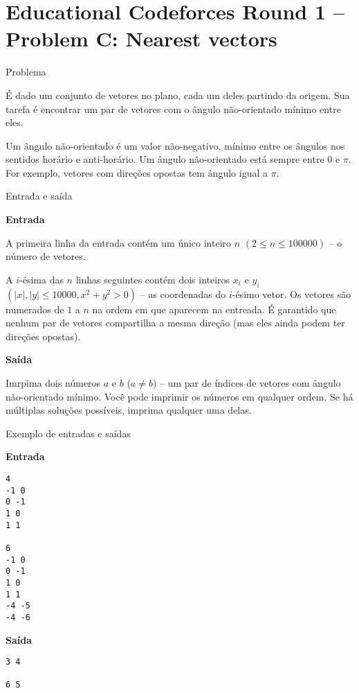 \section{Educational Codeforces Round 1 -- Problem C: Nearest vectors}

\begin{frame}[fragile]{Problema}

É dado um conjunto de vetores no plano, cada um deles partindo da origem. Sua tarefa é encontrar um
par de vetores com o ângulo não-orientado mínimo entre eles.

Um ângulo não-orientado é um valor não-negativo, mínimo entre os ângulos nos sentidos horário e
anti-horário. Um ângulo não-orientado está sempre entre $0$ e $\pi$. For exemplo, vetores com
direções opostas tem ângulo igual a $\pi$.

\end{frame}

\begin{frame}[fragile]{Entrada e saída}

\textbf{Entrada}

A primeira linha da entrada contém um único inteiro $n$ $(2 \leq n \leq 100 000)$ -- o número de
vetores.

A $i$-ésima das $n$ linhas seguintes contém dois inteiros $x_i$ e $y_i$ $(|x|, |y| \leq 10 000, 
x^2 + y^2 > 0)$ -- as coordenadas do $i$-ésimo vetor. Os vetores são numerados de $1$ a $n$ na 
ordem em que aparecem na entreada. É garantido que nenhum par de vetores compartilha a mesma 
direção (mas eles ainda podem ter direções opostas).

\vspace{0.1in}

\textbf{Saída}

Imrpima dois números $a$ e $b$ ($a\neq b$) -- um par de índices de vetores com ângulo não-orientado
mínimo. Você pode imprimir os números em qualquer ordem. Se há múltiplas soluções possíveis, 
imprima qualquer uma delas.

\end{frame}

\begin{frame}[fragile]{Exemplo de entradas e saídas}

\begin{minipage}[t]{0.5\textwidth}
\textbf{Entrada}
\begin{verbatim}
4
-1 0
0 -1
1 0
1 1

6
-1 0
0 -1
1 0
1 1
-4 -5
-4 -6
\end{verbatim}
\end{minipage}
\begin{minipage}[t]{0.45\textwidth}
\textbf{Saída}
\begin{verbatim}
3 4

6 5
\end{verbatim}
\end{minipage}
\end{frame}

